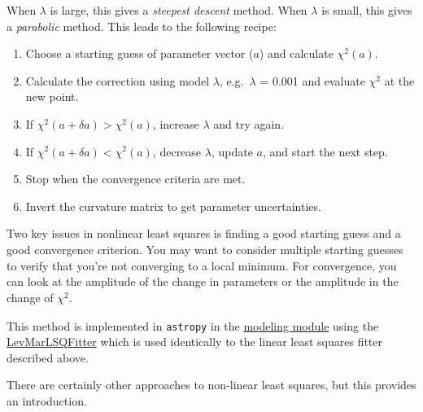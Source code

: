 \documentclass{article}
\begin{document}
When $\lambda$ is large, this gives a \emph{steepest descent} method.
When $\lambda$ is small, this gives a \emph{parabolic} method.
This leads to the following recipe:
\begin{enumerate}
    \item Choose a starting guess of parameter vector ($a$) and
        calculate $\chi^2(a)$.
    \item Calculate the correction using model $\lambda$,
        e.g.\ $\lambda$ = 0.001 and evaluate $\chi^2$ at the new point.
    \item If $\chi^2(a + \delta a) > \chi^2(a)$, increase $\lambda$ and try again.
    \item If $\chi^2(a + \delta a) < \chi^2(a)$, decrease $\lambda$,
        update $a$, and start the next step.
    \item Stop when the convergence criteria are met.
    \item Invert the curvature matrix to get parameter uncertainties.
\end{enumerate}

Two key issues in nonlinear least squares is finding a good starting
guess and a good convergence criterion. You may want to consider
multiple starting guesses to verify that you're not converging to a
local minimum. For convergence, you can look at the amplitude of the
change in parameters or the amplitude in the change of $ \chi^{2}_{}$.

This method is implemented in \texttt{astropy} in the
\href{http://astropy.readthedocs.org/en/v1.0.6/modeling/index.html}
{modeling module} using the
\href{http://docs.astropy.org/en/stable/api/astropy.modeling.fitting.LevMarLSQFitter.html}
{LevMarLSQFitter} which is used identically to the linear least squares
fitter described above.

There are certainly other approaches to non-linear least squares, but
this provides an introduction.
\end{document}
